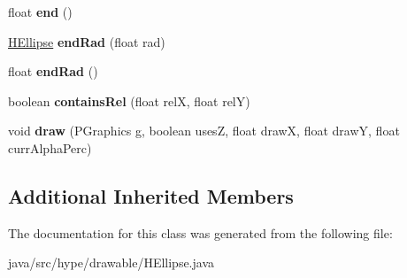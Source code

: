 \begin{DoxyCompactItemize}
\item 
\hypertarget{classhype_1_1drawable_1_1_h_ellipse_a6ff1384aa920dcc6c15690057ae33c24}{float {\bfseries end} ()}\label{classhype_1_1drawable_1_1_h_ellipse_a6ff1384aa920dcc6c15690057ae33c24}

\item 
\hypertarget{classhype_1_1drawable_1_1_h_ellipse_a5b307e00cc0df0f7a9ebe8384a150e8d}{\hyperlink{classhype_1_1drawable_1_1_h_ellipse}{H\-Ellipse} {\bfseries end\-Rad} (float rad)}\label{classhype_1_1drawable_1_1_h_ellipse_a5b307e00cc0df0f7a9ebe8384a150e8d}

\item 
\hypertarget{classhype_1_1drawable_1_1_h_ellipse_a799cccf3358521b4594da6f2371132ee}{float {\bfseries end\-Rad} ()}\label{classhype_1_1drawable_1_1_h_ellipse_a799cccf3358521b4594da6f2371132ee}

\item 
\hypertarget{classhype_1_1drawable_1_1_h_ellipse_ac9695d60c9229944ae52e83e16b19b97}{boolean {\bfseries contains\-Rel} (float rel\-X, float rel\-Y)}\label{classhype_1_1drawable_1_1_h_ellipse_ac9695d60c9229944ae52e83e16b19b97}

\item 
\hypertarget{classhype_1_1drawable_1_1_h_ellipse_a71c00a9c23e26f066688212d47fdd8fc}{void {\bfseries draw} (P\-Graphics g, boolean uses\-Z, float draw\-X, float draw\-Y, float curr\-Alpha\-Perc)}\label{classhype_1_1drawable_1_1_h_ellipse_a71c00a9c23e26f066688212d47fdd8fc}

\end{DoxyCompactItemize}
\subsection*{Additional Inherited Members}


The documentation for this class was generated from the following file\-:\begin{DoxyCompactItemize}
\item 
java/src/hype/drawable/H\-Ellipse.\-java\end{DoxyCompactItemize}
